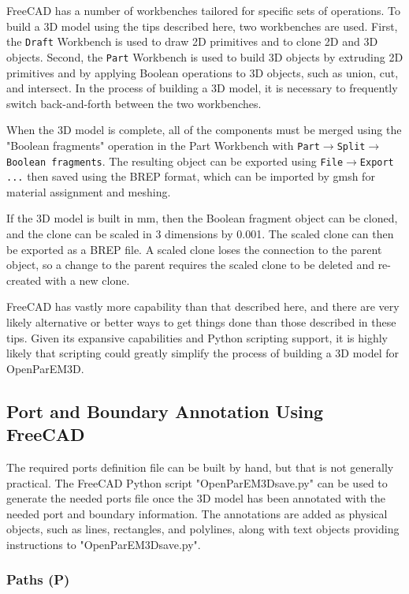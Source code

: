 \documentclass[titlepage]{article}
\renewcommand\_{\textunderscore\linebreak[1]}
\begin{document}
FreeCAD has a number of workbenches tailored for specific sets of operations.  To build a 3D model using the tips described here, two workbenches are used.  First, the \texttt{Draft} Workbench is used to draw 2D primitives and to clone 2D and 3D objects.  Second, the \texttt{Part} Workbench is used to build 3D objects by extruding 2D primitives and by applying Boolean operations to 3D objects, such as union, cut, and intersect.  In the process of building a 3D model, it is necessary to frequently switch back-and-forth between the two workbenches.

When the 3D model is complete, all of the components must be merged using the "Boolean fragments" operation in the Part Workbench with \texttt{Part}$\rightarrow$\texttt{Split}$\rightarrow$\texttt{Boolean fragments}.  The resulting object can be exported using \texttt{File}$\rightarrow$\texttt{Export ...} then saved using the BREP format, which can be imported by gmsh for material assignment and meshing. 

If the 3D model is built in mm, then the Boolean fragment object can be cloned, and the clone can be scaled in 3 dimensions by 0.001.  The scaled clone can then be exported as a BREP file.  A scaled clone loses the connection to the parent object, so a change to the parent requires the scaled clone to be deleted and re-created with a new clone.

FreeCAD has vastly more capability than that described here, and there are very likely alternative or better ways to get things done than those described in these tips.  Given its expansive capabilities and Python scripting support, it is highly likely that scripting could greatly simplify the process of building a 3D model for OpenParEM3D.

\subsection{Port and Boundary Annotation Using FreeCAD}

The required ports definition file can be built by hand, but that is not generally practical.  The FreeCAD Python script "OpenParEM3D\_save.py" can be used to generate the needed ports file once the 3D model has been annotated with the needed port and boundary information.  The annotations are added as physical objects, such as lines, rectangles, and polylines, along with text objects providing instructions to "OpenParEM3D\_save.py". 

\subsubsection{Paths (\_P)}
\label{sec:paths}
\end{document}
